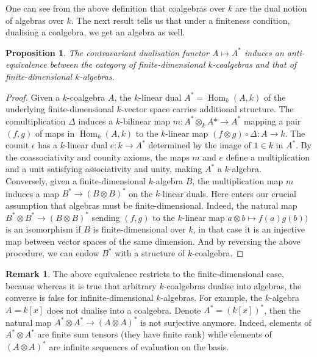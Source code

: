 \documentclass{article}
\theoremstyle{plain}
\newtheorem{proposition}[theorem]{Proposition}
\theoremstyle{definition}
\newtheorem{remark}{Remark}
\DeclareMathOperator{\Hom}{Hom}
\begin{document}
\noindent One can see from the above definition that coalgebras over $k$ are the dual notion of algebras over $k$. 
The next result tells us that under a finiteness condition, dualising a coalgebra, we get an algebra as well.


\begin{proposition}
\label{dualize_algebra_coalgebra}
    The contravariant dualisation functor $A\mapsto A^*$ induces an anti-equivalence between the category of finite-dimensional $k$-coalgebras and that of finite-dimensional $k$-algebras.
\end{proposition}
\begin{proof}
    Given a $k$-coalgebra $A$, the $k$-linear dual $A^* = \Hom_k(A,k)$ of the underlying finite-dimensional $k$-vector space carries additional structure.
    The comultiplication $\Delta$ induces a $k$-bilinear map $m:A^*\otimes_kA*\rightarrow A^*$ mapping a pair $(f,g)$ of maps in $\Hom_k(A,k)$ to the $k$-linear map $(f\otimes g)\circ \Delta : A\rightarrow k$.
    The counit $\epsilon$ has a $k$-linear dual $e :k\rightarrow A^*$ determined by the image of $1\in k$ in $A^*$.
    By the coassociativity and counity axioms, the maps $m$ and $e$ define a multiplication and a unit satisfying associativity and unity, making $A^*$ a $k$-algebra.\\
    Conversely, given a finite-dimensional $k$-algebra $B$, the multiplication map $m$ induces a map $B^*\rightarrow (B\otimes B)^*$ on the $k$-linear duals. 
    Here enters our crucial assumption that algebras must be finite-dimensional.
    Indeed, the natural map $B^*\otimes B^*\rightarrow (B\otimes B)^*$ sending $(f,g)$ to the $k$-linear map $a\otimes b\mapsto f(a)g(b))$ is an isomorphism if $B$ is finite-dimensional over $k$, in that case it is an injective map between vector spaces of the same dimension.
    And by reversing the above procedure, we can endow $B^*$ with a structure of $k$-coalgebra.
\end{proof}



\begin{remark}
\label{dual_algebara_no_coalgebra}
    The above equivalence restricts to the finite-dimensional case, because whereas it is true that arbitrary $k$-coalgebras dualise into algebras, the converse is false for infinite-dimensional $k$-algebras.
    For example, the $k$-algebra $A = k[x]$ does not dualise into a coalgebra.
    Denote $A^* = (k[x])^*$,
    then the natural map $A^*\otimes A^*\rightarrow (A\otimes A)^*$ is not surjective anymore.
    Indeed, elements of $A^*\otimes A^*$ are finite sum tensors (they have finite rank) while elements of $(A\otimes A)^*$ are infinite sequences of evaluation on the basis.
\end{remark}
\end{document}
